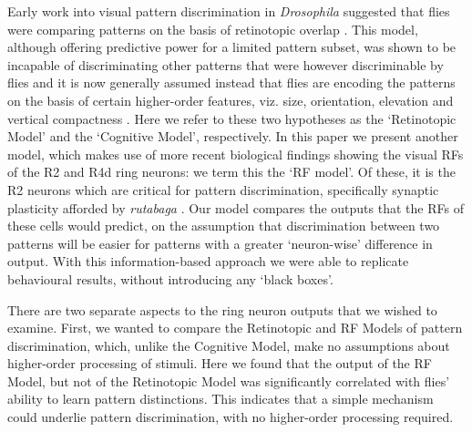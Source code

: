 Early work into visual pattern discrimination in \emph{Drosophila} suggested that flies were comparing patterns on the basis of retinotopic overlap \cite{Dill1995,Dill1993}.
This model, although offering predictive power for a limited pattern subset, was shown to be incapable of discriminating other patterns that were however discriminable by flies \cite{Ernst1999} and it is now generally assumed instead that flies are encoding the patterns on the basis of certain higher-order features, viz. size, orientation, elevation and vertical compactness \cite{Ernst1999,Liu2006,Pan2009}.
Here we refer to these two hypotheses as the `Retinotopic Model' and the `Cognitive Model', respectively.
In this paper we present another model, which makes use of more recent biological findings \cite{Seelig2013} showing the visual RFs of the R2 and R4d ring neurons: we term this the `RF model'.
Of these, it is the R2 neurons which are critical for pattern discrimination, specifically synaptic plasticity afforded by \emph{rutabaga} \cite{Pan2009,Wang2008,Liu2006,Ernst1999}.
Our model compares the outputs that the RFs of these cells would predict, on the assumption that discrimination between two patterns will be easier for patterns with a greater `neuron-wise' difference in output.
With this information-based approach we were able to replicate behavioural results, without introducing any `black boxes'.



There are two separate aspects to the ring neuron outputs that we wished to examine.
First, we wanted to compare the Retinotopic and RF Models of pattern discrimination, which, unlike the Cognitive Model, make no assumptions about higher-order processing of stimuli.
Here we found that the output of the RF Model, but not of the Retinotopic Model was significantly correlated with flies' ability to learn pattern distinctions.
This indicates that a simple mechanism could underlie pattern discrimination, with no higher-order processing required.

